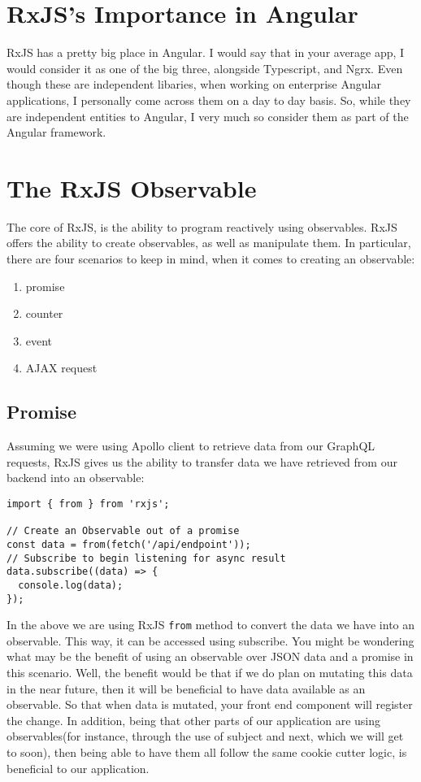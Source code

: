 \section{ RxJS's Importance in Angular }
RxJS has a pretty big place in Angular. I would say that in your average app, 
I would consider it as one of the big three, alongside Typescript, and Ngrx. 
Even though these are independent libaries, when working on enterprise Angular
applications, I personally come across them on a day to day basis. So, while 
they are independent entities to Angular, I very much so consider them as part 
of the Angular framework. 

\section{ The RxJS Observable }
The core of RxJS, is the ability to program reactively using observables. RxJS 
offers the ability to create observables, as well as manipulate them. In 
particular, there are four scenarios to keep in mind, when it comes to creating
an observable: 
\begin{enumerate}
  \item promise
  \item counter
  \item event
  \item AJAX request
\end{enumerate}

\subsection{ Promise }
Assuming we were using Apollo client to retrieve data from our GraphQL 
requests, RxJS gives us the ability to transfer data we have retrieved from our
backend into an observable: 
\begin{lstlisting}
import { from } from 'rxjs';

// Create an Observable out of a promise
const data = from(fetch('/api/endpoint'));
// Subscribe to begin listening for async result
data.subscribe((data) => {
  console.log(data);
});  
\end{lstlisting}

In the above we are using RxJS \lstinline{from} method to convert the data we
have into an observable. This way, it can be accessed using subscribe. You 
might be wondering what may be the benefit of using an observable over JSON 
data and a promise in this scenario. Well, the benefit would be that if we do 
plan on mutating this data in the near future, then it will be beneficial to 
have data available as an observable. So that when data is mutated, your 
front end component will register the change. In addition, being that other parts 
of our application are using observables(for instance, through the use of 
subject and next, which we will get to soon), then being able to have them all
follow the same cookie cutter logic, is beneficial to our application. 

